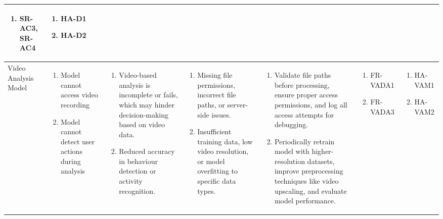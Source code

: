 \documentclass{article}
\begin{document}
\begin{landscape}
\begin{longtable}{|p{3cm}|p{3cm}|p{4cm}|p{4cm}|p{3cm}|p{2cm}|p{3cm}|}
\begin{enumerate}[leftmargin=*]
       \item SR-AC3, SR-AC4
  \end{enumerate} &
  \begin{enumerate}[leftmargin=*]
       \item HA-D1
       \item HA-D2
  \end{enumerate} \\
  \hline
  Video Analysis Model & 
  \begin{enumerate}[leftmargin=*]
      \item Model cannot access video recording
      \item Model cannot detect user actions during analysis
  \end{enumerate} & 
  \begin{enumerate}[leftmargin=*]
      \item Video-based analysis is incomplete or fails, which may hinder decision-making based on video data.
      \item Reduced accuracy in behaviour detection or activity recognition.
  \end{enumerate} &
  \begin{enumerate}[leftmargin=*]
       \item Missing file permissions, incorrect file paths, or server-side issues.
       \item Insufficient training data, low video resolution, or model overfitting to specific data types.
  \end{enumerate} &
  \begin{enumerate}[leftmargin=*]
       \item Validate file paths before processing, ensure proper access permissions, and log all access attempts for debugging.
       \item Periodically retrain model with higher-resolution datasets, improve preprocessing techniques like video upscaling, and evaluate model performance.
  \end{enumerate} &
  \begin{enumerate}[leftmargin=*]
       \item FR-VADA1
       \item FR-VADA3
  \end{enumerate} &
  \begin{enumerate}[leftmargin=*]
       \item HA-VAM1
       \item HA-VAM2
  \end{enumerate} \\

\end{longtable}
\end{landscape}
\end{document}
